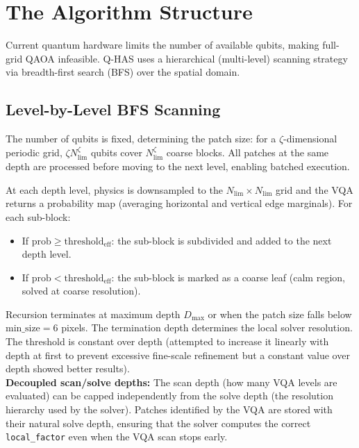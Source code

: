 \documentclass[12pt, a4paper, oneside]{report}
\begin{document}
\chapter{The Algorithm Structure}
\label{chap:algorithm}

Current quantum hardware limits the number of available qubits, making full-grid QAOA infeasible. Q-HAS uses a hierarchical (multi-level) scanning strategy via breadth-first search (BFS) over the spatial domain.

\section{Level-by-Level BFS Scanning}

The number of qubits is fixed, determining the patch size: for a $\zeta$-dimensional periodic grid, $\zeta N_{\text{lim}}^{\zeta}$ qubits cover $N_{\text{lim}}^{\zeta}$ coarse blocks. All patches at the same depth are processed before moving to the next level, enabling batched execution.

At each depth level, physics is downsampled to the $N_{\text{lim}} \times N_{\text{lim}}$ grid and the VQA returns a probability map (averaging horizontal and vertical edge marginals). For each sub-block:
\begin{itemize}
    \item If $\text{prob} \geq \text{threshold}_{\text{eff}}$: the sub-block is subdivided and added to the next depth level.
    \item If $\text{prob} < \text{threshold}_{\text{eff}}$: the sub-block is marked as a coarse leaf (calm region, solved at coarse resolution).
\end{itemize}

Recursion terminates at maximum depth $D_{\text{max}}$ or when the patch size falls below $\text{min\_size} = 6$ pixels. The termination depth determines the local solver resolution. The threshold is constant over depth (attempted to increase it linearly with depth at first to prevent excessive fine-scale refinement but a constant value over depth showed better results).\\

\textbf{Decoupled scan/solve depths:} The scan depth (how many VQA levels are evaluated) can be capped independently from the solve depth (the resolution hierarchy used by the solver). Patches identified by the VQA are stored with their natural solve depth, ensuring that the solver computes the correct \texttt{local\_factor} even when the VQA scan stops early.
\end{document}
